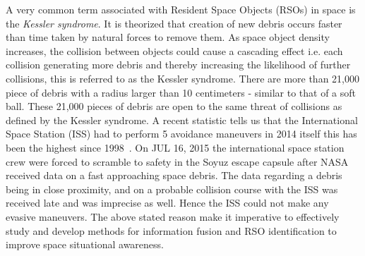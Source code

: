 \documentclass[]{aiaa-tc}%
\begin{document}
 A very common term associated with Resident Space Objects (RSOs) in space is the \textit{Kessler syndrome}. It is theorized that creation of new debris occurs faster than time taken by natural forces to remove them. As space object density  increases, the collision between objects could cause a cascading effect i.e. each collision generating more debris and thereby increasing the likelihood of further collisions, this is referred to as the Kessler syndrome. There are more than 21,000 piece of debris with a radius larger than 10 centimeters  - similar to that of a soft ball\cite{nasa_nasa_2015}. These 21,000 pieces of debris are open to the same threat of collisions as defined by the Kessler syndrome. A recent statistic tells us that the International Space Station (ISS) had to perform 5 avoidance maneuvers in 2014 itself this has been the highest since 1998~\cite{nasa_orbital_2015}. On JUL 16, 2015 the international space station crew were forced to scramble to safety in the Soyuz escape capsule after NASA received data on a fast approaching space debris\cite{evasive_2015}. The data regarding a debris being in close proximity, and on a probable collision course with the ISS was  received late and was imprecise as well. Hence the ISS could not make any evasive maneuvers. The above stated reason make it imperative to effectively study and develop methods for information fusion and RSO identification to improve space situational awareness.\\
\end{document}

